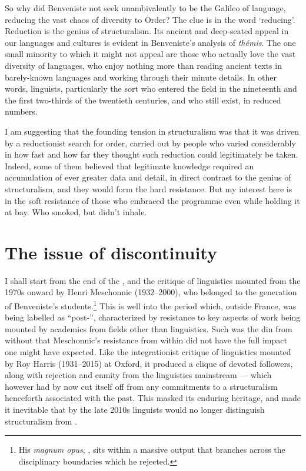 \documentclass[output=paper]{langscibook}
\begin{document}
So why did Benveniste not seek unambivalently to be the Galileo of language, reducing the vast chaos of diversity to Order? The clue is in the word ‘reducing’. Reduction is the genius of structuralism. Its ancient and deep-seated appeal in our languages and cultures is evident in Benveniste's analysis of \emph{thémis}. The one small minority to which it might not appeal are those who actually love the vast diversity of languages, who enjoy nothing more than reading ancient texts in barely-known languages and working through their minute details. In other words, linguists, particularly the sort who entered the field in the nineteenth and the first two-thirds of the twentieth centuries, and who still exist, in reduced numbers.

I am suggesting that the founding tension in structuralism was that it was driven by a reductionist search for order, carried out by people who varied considerably in how fast and how far they thought such reduction could legitimately be taken. Indeed, some of them believed that legitimate knowledge required an accumulation of ever greater data and detail, in direct contrast to the genius of structuralism, and they would form the hard resistance. But my interest here is in the soft resistance of those who embraced the programme even while holding it at bay. Who smoked, but didn’t inhale.

\section{The issue of discontinuity}
\label{sec:joseph:discontinuity}

I shall start from the end of the , and the critique of  linguistics mounted from the 1970s onward by Henri Meschonnic (1932--2000), who belonged to the generation of Benveniste's students.\footnote{His \emph{magnum opus}, \citet{Meschonnic1982}, sits within a massive output that branches across the disciplinary boundaries which he rejected.}  This is well into the period which, outside France, was being labelled as ``post-'', characterized by resistance to key aspects of  work being mounted by academics from fields other than linguistics. Such was the din from without that Meschonnic's resistance from within did not have the full impact one might have expected. Like the integrationist critique of linguistics mounted by Roy Harris (1931--2015) at Oxford, it produced a clique of devoted followers, along with rejection and enmity from the linguistics mainstream — which however had by now cut itself off from any commitments to a structuralism henceforth associated with the past. This masked its enduring heritage, and made it inevitable that by the late 2010s linguists would no longer distinguish structuralism from .
\end{document}
